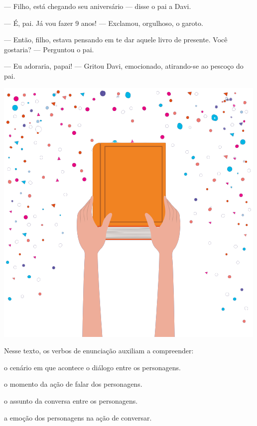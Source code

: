 \begin{myquote}
--- Filho, está chegando seu aniversário --- disse o pai a Davi.

--- É, pai. Já vou fazer 9 anos! --- Exclamou, orgulhoso, o
garoto.

--- Então, filho, estava pensando em te dar aquele livro de
presente. Você gostaria? --- Perguntou o pai.

--- Eu adoraria, papai! --- Gritou Davi, emocionado, atirando-se
ao pescoço do pai.

\begin{center}
\includegraphics[width=.8\textwidth]{./media/image24g.png}
\end{center}

\end{myquote}

Nesse texto, os verbos de enunciação auxiliam a compreender:

\begin{escolha}
\item o cenário em que acontece o diálogo entre os personagens.

\item o momento da ação de falar dos personagens.

\item o assunto da conversa entre os personagens.

\item a emoção dos personagens na ação de conversar.
\end{escolha}


